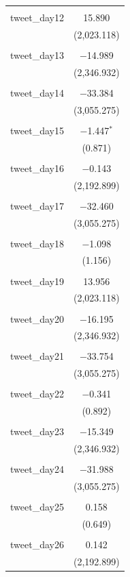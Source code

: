 \documentclass{article}
\begin{document}
\begin{longtable}{@{\extracolsep{10pt}}lc}
  & \\ 
 tweet\_day12 & 15.890 \\ 
  & (2,023.118) \\ 
  & \\ 
 tweet\_day13 & $-$14.989 \\ 
  & (2,346.932) \\ 
  & \\ 
 tweet\_day14 & $-$33.384 \\ 
  & (3,055.275) \\ 
  & \\ 
 tweet\_day15 & $-$1.447$^{*}$ \\ 
  & (0.871) \\ 
  & \\ 
 tweet\_day16 & $-$0.143 \\ 
  & (2,192.899) \\ 
  & \\ 
 tweet\_day17 & $-$32.460 \\ 
  & (3,055.275) \\ 
  & \\ 
 tweet\_day18 & $-$1.098 \\ 
  & (1.156) \\ 
  & \\ 
 tweet\_day19 & 13.956 \\ 
  & (2,023.118) \\ 
  & \\ 
 tweet\_day20 & $-$16.195 \\ 
  & (2,346.932) \\ 
  & \\ 
 tweet\_day21 & $-$33.754 \\ 
  & (3,055.275) \\ 
  & \\ 
 tweet\_day22 & $-$0.341 \\ 
  & (0.892) \\ 
  & \\ 
 tweet\_day23 & $-$15.349 \\ 
  & (2,346.932) \\ 
  & \\ 
 tweet\_day24 & $-$31.988 \\ 
  & (3,055.275) \\ 
  & \\ 
 tweet\_day25 & 0.158 \\ 
  & (0.649) \\ 
  & \\ 
 tweet\_day26 & 0.142 \\ 
  & (2,192.899) \\ 

\end{longtable}
\end{document}
